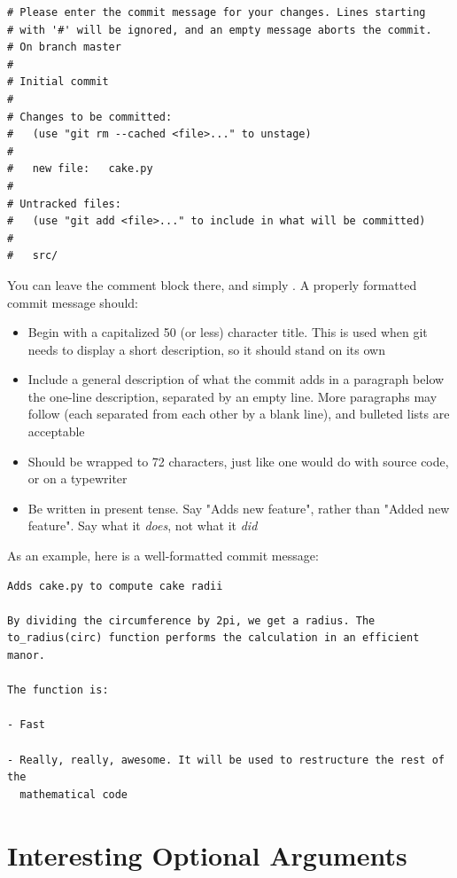\documentclass[11pt,letterpaper,twoside]{report}
\begin{document}
\begin{lstlisting}[numbers=none]
# Please enter the commit message for your changes. Lines starting
# with '#' will be ignored, and an empty message aborts the commit.
# On branch master
#
# Initial commit
#
# Changes to be committed:
#   (use "git rm --cached <file>..." to unstage)
#
#   new file:   cake.py
#
# Untracked files:
#   (use "git add <file>..." to include in what will be committed)
#
#   src/
\end{lstlisting}

You can leave the comment block there, and simply . A properly formatted commit message
should\cite{commit-messages}:

\begin{itemize}
\item Begin with a capitalized 50 (or less) character title. This is used when
    git needs to display a short description, so it should stand on its own
\item Include a general description of what the commit adds in a paragraph below
    the one-line description, separated by an empty line. More paragraphs may
    follow (each separated from each other by a blank line), and bulleted lists
    are acceptable
\item Should be wrapped to 72 characters, just like one would do with source
    code, or on a typewriter
\item Be written in present tense. Say "Adds new feature", rather than "Added
    new feature". Say what it \emph{does}, not what it \emph{did}
\end{itemize}

As an example, here is a well-formatted commit message:


\begin{lstlisting}[numbers=none]
Adds cake.py to compute cake radii

By dividing the circumference by 2pi, we get a radius. The
to_radius(circ) function performs the calculation in an efficient manor.

The function is:

- Fast

- Really, really, awesome. It will be used to restructure the rest of the
  mathematical code
\end{lstlisting}

\section{Interesting Optional Arguments}
\end{document}
